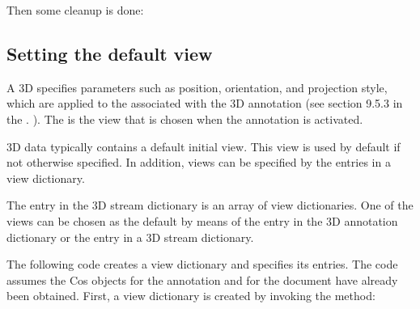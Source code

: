 \documentclass[letterpaper,12pt,english,openany,oneside]{sphinxmanual}
\begin{document}
\begin{sphinxVerbatim}[commandchars=\\\{\}]
  
\end{sphinxVerbatim}

Then some cleanup is done:

\begin{sphinxVerbatim}[commandchars=\\\{\}]
  
\end{sphinxVerbatim}


\subsection{Setting the default view}
\label{\detokenize{Plugins_3D_samples:setting-the-default-view}}
A 3D  specifies parameters such as position, orientation, and projection style, which are applied to the  associated with the 3D annotation (see section 9.5.3 in the . ). The  is the view that is chosen when the annotation is activated.

3D data typically contains a default initial view. This view is used by default if not otherwise specified. In addition, views can be specified by the entries in a view dictionary.

The  entry in the 3D stream dictionary is an array of view dictionaries. One of the views can be chosen as the default by means of the  entry in the 3D annotation dictionary or the  entry in a 3D stream dictionary.

The following code creates a view dictionary and specifies its entries. The code assumes the Cos objects  for the annotation and  for the document have already been obtained. First, a view dictionary is created by invoking the  method:

\begin{sphinxVerbatim}[commandchars=\\\{\}]
      
\end{sphinxVerbatim}
\end{document}
